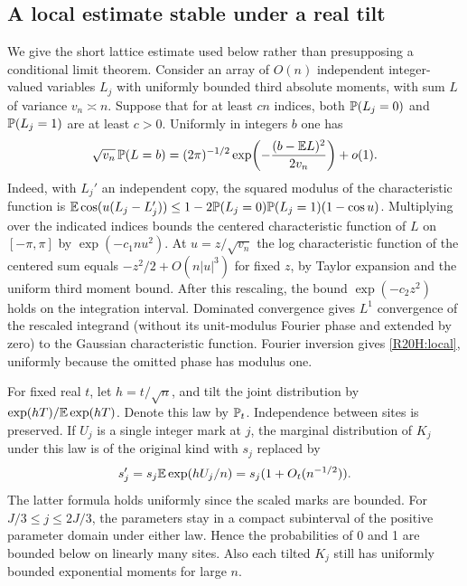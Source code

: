 \documentclass[11pt,a4paper]{article}
\begin{document}
\subsection{A local estimate stable under a real tilt}
We give the short lattice estimate used below rather than presupposing a conditional limit theorem. Consider an array of $O(n)$ independent integer-valued variables $L_j$ with uniformly bounded third absolute moments, with sum $L$ of variance $v_n\asymp n$. Suppose that for at least $c n$ indices, both $\mathbb{P}(L_j=0)$ and $\mathbb{P}(L_j=1)$ are at least $c>0$. Uniformly in integers $b$ one has
\begin{equation}\label{R20H:local}
 \sqrt{v_n}\,\mathbb{P}(L=b)=
 (2\pi)^{-1/2}\exp\!\left(-\frac{(b-\mathbb{E} L)^2}{2v_n}\right)+o(1).
\end{equation}
Indeed, with $L_j'$ an independent copy, the squared modulus of the characteristic function is $\mathbb{E}\cos(u(L_j-L_j'))\le 1-2\mathbb{P}(L_j=0)\mathbb{P}(L_j=1)(1-\cos u)$. Multiplying over the indicated indices bounds the centered characteristic function of $L$ on $[-\pi,\pi]$ by $\exp(-c_1 n u^2)$. At $u=z/\sqrt{v_n}$ the log characteristic function of the centered sum equals $-z^2/2+O(n|u|^3)$ for fixed $z$, by Taylor expansion and the uniform third moment bound. After this rescaling, the bound $\exp(-c_2 z^2)$ holds on the integration interval. Dominated convergence gives $L^1$ convergence of the rescaled integrand (without its unit-modulus Fourier phase and extended by zero) to the Gaussian characteristic function. Fourier inversion gives \eqref{R20H:local}, uniformly because the omitted phase has modulus one.

For fixed real $t$, let $h=t/\sqrt n$, and tilt the joint distribution by $\exp(h T)/\mathbb{E}\exp(h T)$. Denote this law by $\mathbb{P}_t$. Independence between sites is preserved. If $U_j$ is a single integer mark at $j$, the marginal distribution of $K_j$ under this law is of the original kind with $s_j$ replaced by
\[
 s'_j=s_j\mathbb{E}\exp(h U_j/n)=s_j(1+O_t(n^{-1/2})).
\]
The latter formula holds uniformly since the scaled marks are bounded. For $J/3\le j\le 2J/3$, the parameters stay in a compact subinterval of the positive parameter domain under either law. Hence the probabilities of 0 and 1 are bounded below on linearly many sites. Also each tilted $K_j$ still has uniformly bounded exponential moments for large $n$.
\end{document}

